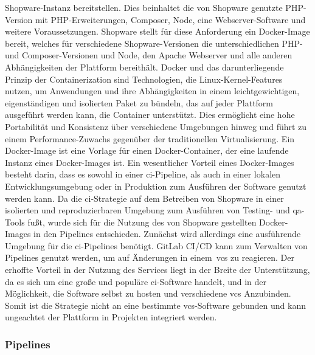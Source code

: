 Shopware-Instanz bereitstellen.
Dies beinhaltet die von Shopware genutzte PHP-Version mit PHP-Erweiterungen, Composer, Node, eine
Webserver-Software und weitere Voraussetzungen.
Shopware stellt für diese Anforderung ein Docker-Image bereit, welches für verschiedene Shopware-Versionen
die unterschiedlichen PHP- und Composer-Versionen und Node, den Apache Webserver und alle anderen Abhängigkeiten
der Plattform bereithält.
Docker und das darunterliegende Prinzip der Containerization sind Technologien, die Linux-Kernel-Features nutzen, um
Anwendungen und ihre Abhängigkeiten in einem leichtgewichtigen, eigenständigen und isolierten Paket zu bündeln, das auf
jeder Plattform ausgeführt werden kann, die Container unterstützt.
Dies ermöglicht eine hohe Portabilität und Konsistenz über verschiedene Umgebungen hinweg und führt zu einem
Performance-Zuwachs gegenüber der traditionellen Virtualisierung.
Ein Docker-Image ist eine Vorlage für einen Docker-Container, der eine laufende Instanz eines Docker-Images ist.
Ein wesentlicher Vorteil eines Docker-Images besteht darin, dass es sowohl in einer \acrshort{ci}-Pipeline, als auch in
einer lokalen Entwicklungsumgebung oder in Produktion zum Ausführen der Software genutzt werden kann.
Da die \acrshort{ci}-Strategie auf dem Betreiben von Shopware in einer isolierten und reproduzierbaren Umgebung zum
Ausführen von Testing- und \acrshort{qa}-Tools fußt, wurde sich für die Nutzung des von Shopware gestellten
Docker-Images in den Pipelines entschieden.
Zunächst wird allerdings eine ausführende Umgebung für die \acrshort{ci}-Pipelines benötigt.
GitLab CI/CD kann zum Verwalten von Pipelines genutzt werden, um auf Änderungen in einem\ \acrshort{vcs} zu reagieren.
Der erhoffte Vorteil in der Nutzung des Services liegt in der Breite der Unterstützung, da es sich um eine große und
populäre \acrshort{ci}-Software handelt, und in der Möglichkeit, die Software selbst zu hosten und verschiedene
\acrshort{vcs} Anzubinden.
Somit ist die Strategie nicht an eine bestimmte \acrshort{vcs}-Software gebunden und kann ungeachtet der Plattform in
Projekten integriert werden.

\subsubsection{Pipelines}

